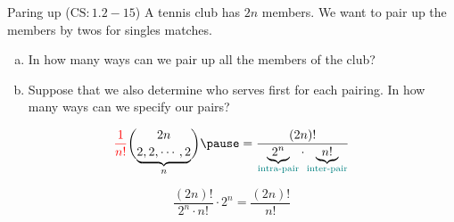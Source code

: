 
\begin{frame}{}
  \begin{exampleblock}{Paring up ($\text{CS}: 1.2-15$)}
    A tennis club has $2n$ members. 
    We want to pair up the members by twos for singles matches. 
    
    \begin{enumerate}[(a)]
      \item In how many ways can we pair up all the members of the club? 
      \item Suppose that we also determine who serves first for each pairing. 
	In how many ways can we specify our pairs?
    \end{enumerate}
  \end{exampleblock}

  \pause
  \[
    \red{\frac{1}{n!}} \binom{2n}{\underbrace{2,2,\cdots,2}_{n}}
    \pause = \frac{(2n)!}{\underbrace{2^{n}}_{\text{\teal{intra-pair}}} \cdot \underbrace{n!}_{\text{\teal{inter-pair}}}}
  \]

  \pause
  \[
    \frac{(2n)!}{2^{n} \cdot n!} \cdot 2^n = \frac{(2n)!}{n!}
  \]
\end{frame}
